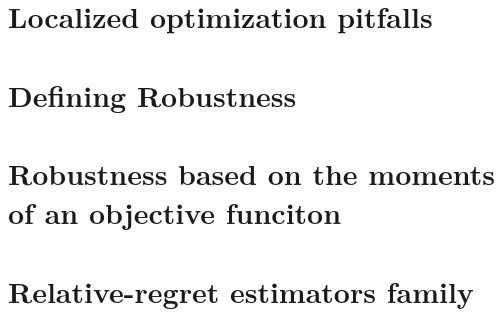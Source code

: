 \documentclass[../../Main_ManuscritThese.tex]{subfiles}
\begin{document}
\label{chap:robust_estimators}
\minitoc
\newpage
\subfileLocal{\pagestyle{contentStyle}}

\section{Localized optimization pitfalls}
\label{sec:local_optimization_pitfalls}

\section{Defining Robustness}
\label{sec:def_robustness}

\section{Robustness based on the moments of an objective funciton}
\label{sec:rob_moments}

\section{Relative-regret estimators family}
\label{sec:rr_family}



\subfileLocal{
	\pagestyle{empty}
	
	
      }
\end{document}
